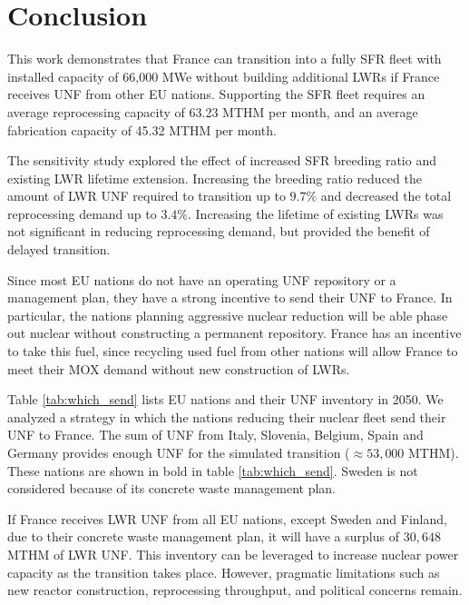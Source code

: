 \section{Conclusion}

This work demonstrates that France can transition into
a fully \gls{SFR} fleet with installed capacity of 66,000 \gls{MWe} without
building additional \glspl{LWR}
if France receives \gls{UNF} from other \gls{EU} nations.
Supporting the \gls{SFR} fleet requires an average 
reprocessing capacity of 63.23 \gls{MTHM} per month,
and an average fabrication capacity of 45.32 \gls{MTHM} per month.

The sensitivity study explored the effect of increased \gls{SFR} breeding
ratio and existing \gls{LWR} lifetime extension. Increasing the breeding
ratio reduced the amount of \gls{LWR} \gls{UNF} required to transition
up to $9.7\%$ and decreased the total reprocessing demand up to $3.4\%$.
Increasing the lifetime of existing \glspl{LWR} was not significant
in reducing reprocessing demand, but provided the benefit of delayed
transition.

Since most \gls{EU} nations do not have an operating \gls{UNF}
repository or a management plan, they have a strong incentive
to send their \gls{UNF} to France. In particular, the nations
planning aggressive nuclear reduction will be able phase out nuclear
without constructing a permanent repository. France has an
incentive to take this fuel, since recycling used fuel from
other nations will allow France to meet their MOX demand
without new construction of \glspl{LWR}.

Table \ref{tab:which_send} lists \gls{EU} nations and their \gls{UNF} inventory
in 2050. We analyzed a strategy in which 
the nations reducing their nuclear fleet send their \gls{UNF} to France.
The sum of \gls{UNF} from Italy, Slovenia, Belgium, Spain and Germany
provides enough \gls{UNF} for the simulated transition ($\approx 53,000$ MTHM). 
These nations are shown in bold in table \ref{tab:which_send}.
Sweden is not considered because of its concrete waste management plan.

If France receives \gls{LWR} \gls{UNF} from all \gls{EU} nations,
except Sweden and Finland, due to their concrete waste management plan,
it will have a surplus of $30,648$ MTHM of \gls{LWR} \gls{UNF}. This
inventory can be leveraged to increase nuclear power capacity as
the transition takes place. However, pragmatic limitations such
as new reactor construction, reprocessing throughput, and
political concerns remain.

